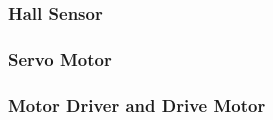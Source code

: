 \subsubsection{Hall Sensor}
\indent

\subsubsection{Servo Motor}
\indent

\subsubsection{Motor Driver and Drive Motor}
\indent
